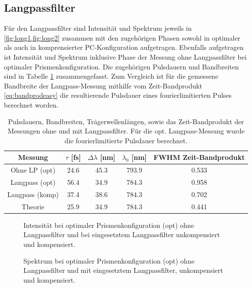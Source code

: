 \documentclass[twoside,        %
               BCOR12mm,       %
               english,ngerman, %
               fleqn,headsepline=false,footsepline=false
              ]{Vorlage/MFPREPORT}
\begin{document}
\subsection{Langpassfilter}
Für den Langpassfilter sind Intensität und Spektrum jeweils in
\cref{fig:long1,fig:long2} zusammen mit den zugehörigen Phasen sowohl in
optimaler als auch in komprensierter PC-Konfiguration aufgetragen.
Ebenfalls aufgetragen ist Intensität und Spektrum inklusive Phase der Messung
ohne Langpassfilter bei optimaler Prismenkonfiguration. Die zugehörigen
Pulsdauern und Bandbreiten sind in Tabelle \cref{tab:long} zusammengefasst.
Zum Vergleich ist für die gemessene Bandbreite der Langpass-Messung mithilfe
vom Zeit-Bandprodukt \cref{eq:bandprodeasy} die resultierende Pulsdauer eines
fourierlimitierten Pulses berechnet worden.


\begin{table}
    \centering
    \begin{tabular}[]{|c||c|c|c|c|}
        \hline
        Messung&$\tau$ [fs]&$\Delta\lambda$ [nm]&$\lambda_0$ [nm]&FWHM Zeit-Bandprodukt\\\hline
        Ohne LP (opt)&24.6&45.3&793.9&0.533\\\hline
        Langpass (opt)&56.4&34.9&784.3&0.958\\\hline
        Langpass (komp)&37.4&38.6&784.3&0.702\\\hline\hline
        Theorie &25.9&34.9&784.3&0.441\\\hline

    \end{tabular}
    \caption{Pulsdauern, Bandbreiten, Trägerwellenlängen, sowie das
    Zeit-Bandprodukt der Messungen ohne und mit Langpassfilter. Für die opt.
Langpass-Messung wurde die fourierlimitierte Pulsdauer berechnet. }
    \label{tab:long}
\end{table}


\begin{figure}[]
    \begin{center}
        
    \end{center}
    \caption{Intensität bei optimaler Prismenkonfiguration (opt) ohne
    Langpassfilter und bei
    eingesetztem Langpassfilter unkompensiert und kompensiert.}
    \label{fig:long1}
\end{figure}

\begin{figure}[]
    \begin{center}
        
    \end{center}
    \caption{Spektrum bei optimaler Prismenkonfiguration (opt) ohne
    Langpassfilter und mit eingesetztem Langpassfilter, unkompensiert und
    kompensiert.}
    \label{fig:long2}
\end{figure}
\end{document}
